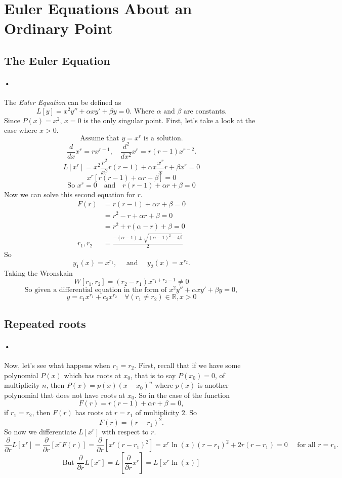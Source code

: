 \documentclass[font =22]{report}
\begin{document}
\section{Euler Equations About an Ordinary Point}
\subsection*{ The Euler Equation}
\paragraph{•}
The \textit{Euler Equation} can be defined as 
\[
L[y] = x^2y''+\alpha xy'+\beta y = 0. \text{ Where } \alpha \text{ and } \beta \text{ are constants.}
\] 
Since $P(x) = x^2$, $x=0$ is the only singular point. First, let's take a look at the case where $x>0$.
\[
\text{Assume that }y=x^r \text{ is a solution.}
\]
\[
\frac{d}{dx}x^r = rx^{r-1}, \quad \frac{d^2}{dx^2}x^r = r(r-1)x^{r-2}.
\]
\[
L[x^r]= x^2\frac{r^2}{x^2}r(r-1) + \alpha x\frac{x^r }{x}r+\beta x^r = 0
\]
\[
x^r[r(r-1)+\alpha r + \beta] = 0
\]
\[
\text{So } x^r = 0 \quad \text{and} \quad r(r-1)+\alpha r + \beta= 0
\]
Now we can solve this second equation for $r$.
\begin{align*}
F(r) &= r(r-1)+\alpha r + \beta= 0 \\
&= r^2-r+\alpha r+ \beta = 0 \\
&= r^2 +r(\alpha - r)+ \beta = 0\\
r_1,r_2 &= \frac{-(\alpha - 1) \pm \sqrt{(\alpha - 1)^2-4\beta}}{2}
\end{align*}
So 
\[
y_1(x) = x^{r_1}, \quad \text{ and } \quad y_2(x)= x^{r_2}.
\]
Taking the Wronskain 
\[
W[r_1,r_2] = (r_2-r_1)x^{r_1+r_2-1} \neq 0 
\]
\[
\text{So given a differential equation in the form of }  x^2y''+\alpha xy'+\beta y = 0, 
\]
\[
y = c_1x^{r_1}+c_2x^{r_2} \quad \forall (r_1 \neq r_2) \in \mathbb R, x>0
\]

\subsection{Repeated roots}
\paragraph{•}
Now, let's see what happens when $r_1 = r_2$. First, recall that if we have some polynomial $P(x)$ which has roots at $x_0$, that is to say $P(x_0) = 0$, of multiplicity $n$, then $P(x) = p(x)(x-x_0)^n$ where $p(x)$ is another polynomial that does not have roots at $x_0$. So in the case of the function 
\[
 F(r) = r(r-1)+\alpha r + \beta= 0,
\]
if $r_1 = r_2$, then $F(r)$ has roots at $r = r_1$ of multiplicity $2$. So 
\[
 F(r) = (r-r_1)^2. 
\]
So now we differentiate $L[x^r]$ with respect to $r$.
\[
\frac{\partial}{\partial r}L[x^r] = \frac{\partial}{\partial r}[x^rF(r)] = \frac{\partial}{\partial r}[x^r(r-r_1)^2] = x^r \ln(x)(r-r_1)^2 + 2r(r-r_1) = 0\quad
\text{ for all }r=r_1.
\]
\[
\text{But } \frac{\partial}{\partial r}L[x^r] = L\left[\frac{\partial}{\partial r}x^r\right] = L[x^r \ln(x)]  
\]
\end{document}
